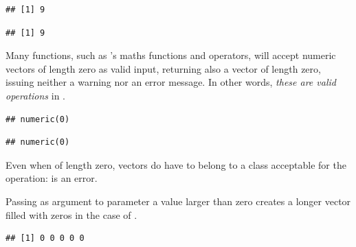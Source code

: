 \documentclass[krantz2]{krantz}\usepackage{knitr}
\begin{document}
\begin{explainbox}
\begin{knitrout}\footnotesize
{}\color{fgcolor}\begin{kframe}
\begin{alltt}
\hlstd{(} \hlstd{(}
\end{alltt}
\begin{verbatim}
## [1] 9
\end{verbatim}
\begin{alltt}
\hlstd{(}
\end{alltt}
\begin{verbatim}
## [1] 9
\end{verbatim}
\end{kframe}
\end{knitrout}

Many functions, such as \Rlang's maths functions and operators, will accept numeric vectors of length zero as valid input, returning also a vector of length zero, issuing neither a warning nor an error message. In other words, \emph{these are valid operations} in \Rlang.

\begin{knitrout}\footnotesize
{}\color{fgcolor}\begin{kframe}
\begin{alltt}
\hlstd{(}\hlstd{(}\hlstd{))}
\end{alltt}
\begin{verbatim}
## numeric(0)
\end{verbatim}
\begin{alltt}
 \hlopt{+} \hlstd{(}\hlstd{)}
\end{alltt}
\begin{verbatim}
## numeric(0)
\end{verbatim}
\end{kframe}
\end{knitrout}

Even when of length zero, vectors do have to belong to a class acceptable for the operation:  is an error.

Passing as argument to parameter  a value larger than zero creates a longer vector filled with zeros in the case of .

\begin{knitrout}\footnotesize
{}\color{fgcolor}\begin{kframe}
\begin{alltt}
\hlstd{(}\hlstd{)}
\end{alltt}
\begin{verbatim}
## [1] 0 0 0 0 0
\end{verbatim}
\end{kframe}
\end{knitrout}


\end{explainbox}
\end{document}
